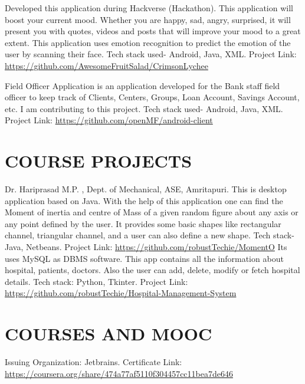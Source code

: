 \documentclass[11pt,a4paper,sans]{moderncv}        %
\begin{document}
{Developed this application during Hackverse (Hackathon). This application will boost your current mood. Whether you are happy, sad, angry, surprised, it will present you with quotes, videos and posts that will improve your mood to a great extent. This application uses emotion recognition to predict the emotion of the user by scanning their face. Tech stack used- Android, Java, XML. Project Link: {\newline}
\url{https://github.com/AwesomeFruitSalad/CrimsonLychee}}{}

{Field Officer Application is an application developed for the Bank staff field officer to keep track of Clients, Centers, Groups, Loan Account, Savings Account, etc. I am contributing to this project. Tech stack used- Android, Java, XML. Project Link: {\newline} 
\url{https://github.com/openMF/android-client}}{}  %

\section{COURSE PROJECTS}
{Dr. Hariprasad M.P. , Dept. of Mechanical, ASE, Amritapuri.{\newline}
This is desktop application based on Java. With the help of this application one can find the Moment of inertia and centre of Mass of a given random figure about any axis or any point defined by the user. It provides some basic shapes like rectangular channel, triangular channel, and a user can also define a new shape. Tech stack- Java, Netbeans. Project Link: {\newline}
\url{https://github.com/robustTechie/MomentO}}{}
{Its uses MySQL as DBMS software. This app contains all the information about hospital, patients, doctors. Also the user can add, delete, modify or fetch hospital details. Tech stack: Python, Tkinter. Project Link:   {\newline}
\url{https://github.com/robustTechie/Hospital-Management-System}}{}



\section{COURSES AND MOOC}
{Issuing Organization: Jetbrains.{\newline}
Certificate Link:
\url{https://coursera.org/share/474a77af5110f304457cc11bea7de646}}{}
\end{document}
